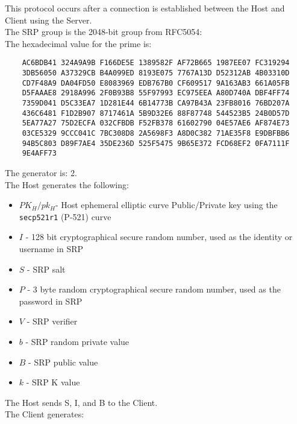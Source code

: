 \documentclass{article}
\begin{document}
    This protocol occurs after a connection is established between the Host and
    Client using the Server.\\

    The SRP group is the 2048-bit group from RFC5054:\\

    The hexadecimal value for the prime is:\\

    \begin{verbatim}
    AC6BDB41 324A9A9B F166DE5E 1389582F AF72B665 1987EE07 FC319294
    3DB56050 A37329CB B4A099ED 8193E075 7767A13D D52312AB 4B03310D
    CD7F48A9 DA04FD50 E8083969 EDB767B0 CF609517 9A163AB3 661A05FB
    D5FAAAE8 2918A996 2F0B93B8 55F97993 EC975EEA A80D740A DBF4FF74
    7359D041 D5C33EA7 1D281E44 6B14773B CA97B43A 23FB8016 76BD207A
    436C6481 F1D2B907 8717461A 5B9D32E6 88F87748 544523B5 24B0D57D
    5EA77A27 75D2ECFA 032CFBDB F52FB378 61602790 04E57AE6 AF874E73
    03CE5329 9CCC041C 7BC308D8 2A5698F3 A8D0C382 71AE35F8 E9DBFBB6
    94B5C803 D89F7AE4 35DE236D 525F5475 9B65E372 FCD68EF2 0FA7111F
    9E4AFF73
    \end{verbatim}

    The generator is: 2.\\

    The Host generates the following:\\

    \begin{itemize}
        \item $PK_H/pk_H$- Host ephemeral elliptic curve Public/Private
        key using the \texttt{secp521r1} (P-521) curve
        \item $I$ - 128 bit cryptographical secure random number, used as the identity or
        username in SRP
        \item $S$ - SRP salt
        \item $P$ - 3 byte random cryptographical secure random number, used as the password
        in SRP
        \item $V$ - SRP verifier
        \item $b$ - SRP random private value
        \item $B$ - SRP public value
        \item $k$ - SRP K value
    \end{itemize}

    The Host sends S, I, and B to the Client.\\

    The Client generates:\\
\end{document}
